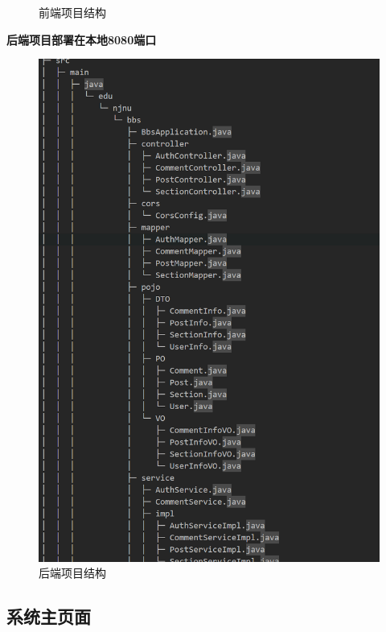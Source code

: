 \documentclass[UTF8]{ctexart}
\begin{document}
\begin{figure}[H]
  \caption{前端项目结构}
\end{figure}

\textbf{后端项目部署在本地8080端口}

\begin{figure}[H]
  \centering
  \includegraphics[scale=0.3]{系统实现/后端项目结构.png}
  \caption{后端项目结构}
\end{figure}


\subsection{系统主页面}
\end{document}
